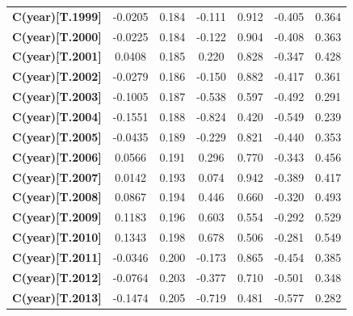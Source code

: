 \begin{center}
\begin{tabular}{lcccccc}
\textbf{C(year)[T.1999]}     &      -0.0205  &        0.184     &    -0.111  &         0.912        &       -0.405    &        0.364     \\
\textbf{C(year)[T.2000]}     &      -0.0225  &        0.184     &    -0.122  &         0.904        &       -0.408    &        0.363     \\
\textbf{C(year)[T.2001]}     &       0.0408  &        0.185     &     0.220  &         0.828        &       -0.347    &        0.428     \\
\textbf{C(year)[T.2002]}     &      -0.0279  &        0.186     &    -0.150  &         0.882        &       -0.417    &        0.361     \\
\textbf{C(year)[T.2003]}     &      -0.1005  &        0.187     &    -0.538  &         0.597        &       -0.492    &        0.291     \\
\textbf{C(year)[T.2004]}     &      -0.1551  &        0.188     &    -0.824  &         0.420        &       -0.549    &        0.239     \\
\textbf{C(year)[T.2005]}     &      -0.0435  &        0.189     &    -0.229  &         0.821        &       -0.440    &        0.353     \\
\textbf{C(year)[T.2006]}     &       0.0566  &        0.191     &     0.296  &         0.770        &       -0.343    &        0.456     \\
\textbf{C(year)[T.2007]}     &       0.0142  &        0.193     &     0.074  &         0.942        &       -0.389    &        0.417     \\
\textbf{C(year)[T.2008]}     &       0.0867  &        0.194     &     0.446  &         0.660        &       -0.320    &        0.493     \\
\textbf{C(year)[T.2009]}     &       0.1183  &        0.196     &     0.603  &         0.554        &       -0.292    &        0.529     \\
\textbf{C(year)[T.2010]}     &       0.1343  &        0.198     &     0.678  &         0.506        &       -0.281    &        0.549     \\
\textbf{C(year)[T.2011]}     &      -0.0346  &        0.200     &    -0.173  &         0.865        &       -0.454    &        0.385     \\
\textbf{C(year)[T.2012]}     &      -0.0764  &        0.203     &    -0.377  &         0.710        &       -0.501    &        0.348     \\
\textbf{C(year)[T.2013]}     &      -0.1474  &        0.205     &    -0.719  &         0.481        &       -0.577    &        0.282     \\

\end{tabular}
\end{center}
